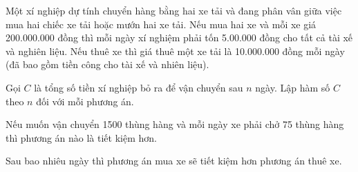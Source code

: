 \begin{bt}%
	Một xí nghiệp dự tính chuyển hàng bằng hai xe tải và đang phân vân giữa việc mua hai chiếc xe tải hoặc mướn hai xe tải. Nếu mua hai xe và mỗi xe giá 200.000.000 đồng thì mỗi ngày xí nghiệm phải tốn 5.00.000 đồng cho tất cả tài xế và nghiên liệu. Nếu thuê xe thì giá thuê một xe tải là 10.000.000 đồng mỗi ngày (đã bao gồm tiền công cho tài xế và nhiên liệu).
	\begin{listEX}[1]
		\item Gọi $C$ là tổng số tiền xí nghiệp bỏ ra để vận chuyển sau $n$ ngày. Lập hàm số $C$ theo $n$ đối với mỗi phương án.
		\item Nếu muốn vận chuyển 1500 thùng hàng và mỗi ngày xe phải chở 75 thùng hàng thì phương án nào là tiết kiệm hơn.
		\item Sau bao nhiêu ngày thì phương án mua xe sẽ tiết kiệm hơn phương án thuê xe.
	\end{listEX}
\end{bt}

